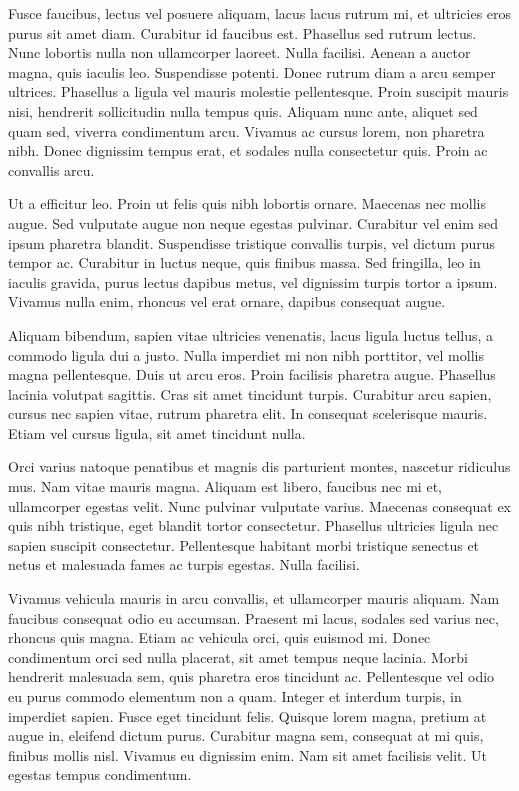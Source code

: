 \documentclass{homework}
\begin{document}
Fusce faucibus, lectus vel posuere aliquam, lacus lacus rutrum mi, et ultricies eros purus sit amet diam. Curabitur id faucibus est. Phasellus sed rutrum lectus. Nunc lobortis nulla non ullamcorper laoreet. Nulla facilisi. Aenean a auctor magna, quis iaculis leo. Suspendisse potenti. Donec rutrum diam a arcu semper ultrices. Phasellus a ligula vel mauris molestie pellentesque. Proin suscipit mauris nisi, hendrerit sollicitudin nulla tempus quis. Aliquam nunc ante, aliquet sed quam sed, viverra condimentum arcu. Vivamus ac cursus lorem, non pharetra nibh. Donec dignissim tempus erat, et sodales nulla consectetur quis. Proin ac convallis arcu.

Ut a efficitur leo. Proin ut felis quis nibh lobortis ornare. Maecenas nec mollis augue. Sed vulputate augue non neque egestas pulvinar. Curabitur vel enim sed ipsum pharetra blandit. Suspendisse tristique convallis turpis, vel dictum purus tempor ac. Curabitur in luctus neque, quis finibus massa. Sed fringilla, leo in iaculis gravida, purus lectus dapibus metus, vel dignissim turpis tortor a ipsum. Vivamus nulla enim, rhoncus vel erat ornare, dapibus consequat augue.

Aliquam bibendum, sapien vitae ultricies venenatis, lacus ligula luctus tellus, a commodo ligula dui a justo. Nulla imperdiet mi non nibh porttitor, vel mollis magna pellentesque. Duis ut arcu eros. Proin facilisis pharetra augue. Phasellus lacinia volutpat sagittis. Cras sit amet tincidunt turpis. Curabitur arcu sapien, cursus nec sapien vitae, rutrum pharetra elit. In consequat scelerisque mauris. Etiam vel cursus ligula, sit amet tincidunt nulla.

Orci varius natoque penatibus et magnis dis parturient montes, nascetur ridiculus mus. Nam vitae mauris magna. Aliquam est libero, faucibus nec mi et, ullamcorper egestas velit. Nunc pulvinar vulputate varius. Maecenas consequat ex quis nibh tristique, eget blandit tortor consectetur. Phasellus ultricies ligula nec sapien suscipit consectetur. Pellentesque habitant morbi tristique senectus et netus et malesuada fames ac turpis egestas. Nulla facilisi.

Vivamus vehicula mauris in arcu convallis, et ullamcorper mauris aliquam. Nam faucibus consequat odio eu accumsan. Praesent mi lacus, sodales sed varius nec, rhoncus quis magna. Etiam ac vehicula orci, quis euismod mi. Donec condimentum orci sed nulla placerat, sit amet tempus neque lacinia. Morbi hendrerit malesuada sem, quis pharetra eros tincidunt ac. Pellentesque vel odio eu purus commodo elementum non a quam. Integer et interdum turpis, in imperdiet sapien. Fusce eget tincidunt felis. Quisque lorem magna, pretium at augue in, eleifend dictum purus. Curabitur magna sem, consequat at mi quis, finibus mollis nisl. Vivamus eu dignissim enim. Nam sit amet facilisis velit. Ut egestas tempus condimentum.
\end{document}
